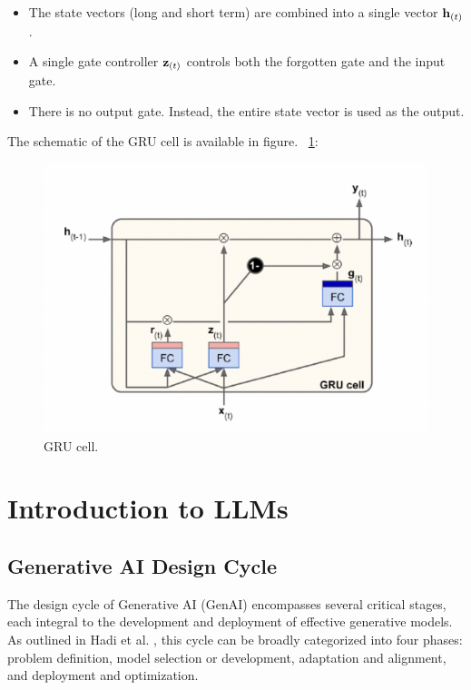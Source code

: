 \begin{itemize}
    \item The state vectors (long and short term) are combined into a single vector ${\bf h}_{(t)}$.
    \item A single gate controller ${\bf z}_{(t)}$ controls both the forgotten gate and the input gate.
    \item There is no output gate. Instead, the entire state vector is used as the output.
\end{itemize}
The schematic of the GRU cell is available in figure. ~\ref{fig:GRU_cell}:
\begin{figure} [h]
    \centering
    \includegraphics[width=\textwidth,height=\textheight,keepaspectratio]{Assets/Theory_and_methods/unnamed-9.png}
    \caption{GRU cell.}
    \label{fig:GRU_cell}
\end{figure}

\clearpage
\section{Introduction to LLMs}
\subsection{Generative AI Design Cycle}
The design cycle of Generative AI (GenAI) encompasses several critical stages, each integral to the development and deployment of effective generative models. As outlined in Hadi et al. \cite{hadi2024}, this cycle can be broadly categorized into four phases: problem definition, model selection or development, adaptation and alignment, and deployment and optimization.

